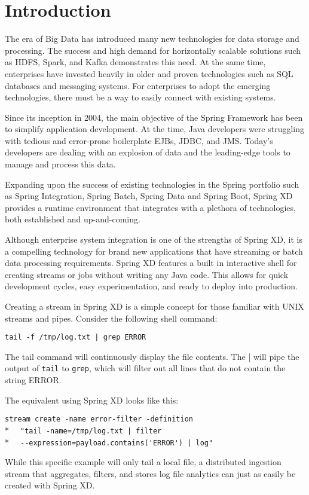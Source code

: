 \section{Introduction}

The era of Big Data has introduced many new technologies for data storage
and processing. The success and high demand for horizontally scalable
solutions such as HDFS\cite{hdfs}, Spark\cite{spark}, and Kafka\cite{kafka} demonstrates
this need.  At the same time, enterprises have invested heavily in older and proven
technologies such as SQL databases and messaging systems. For enterprises
to adopt the emerging technologies, there must be a way to easily
connect with existing systems.

Since its inception in 2004, the main objective of the 
Spring Framework\cite{spring-framework-reference}
has been to simplify application development. At the time, Java developers
were struggling with tedious and error-prone boilerplate EJBs\cite{ejb}, JDBC\cite{jdbc},
and JMS\cite{jms}. Today's developers are dealing with an explosion of data and the
leading-edge tools to manage and process this data.

Expanding upon the success of existing technologies in the Spring portfolio
such as Spring Integration\cite{spring-integration-reference},
Spring Batch\cite{spring-batch-reference}, Spring Data\cite{spring-data-reference} and
Spring Boot\cite{spring-boot-reference},
Spring XD provides a runtime environment that integrates with
a plethora of technologies, both established and up-and-coming.

Although enterprise system integration is one of the strengths of Spring XD,
it is a compelling technology for brand new applications that have streaming
or batch data processing requirements. Spring XD features a built in
interactive shell for creating streams or jobs without writing any Java code.
This allows for quick development cycles, easy experimentation, and ready
to deploy into production.

Creating a stream in Spring XD is a simple concept for those familiar with
UNIX streams and pipes. Consider the following shell command:

\verb;tail -f /tmp/log.txt | grep ERROR;

The tail command will continuously display the file contents. The |
will pipe the output of \texttt{tail} to \texttt{grep}, which will filter 
out all lines that do not contain the string ERROR.

The equivalent using Spring XD looks like this:

\verb;stream create -name error-filter -definition;\\*
\verb;  "tail -name=/tmp/log.txt | filter;\\*
\verb;  --expression=payload.contains('ERROR') | log";

While this specific example will only tail a local file, a distributed 
ingestion stream that aggregates, filters, and stores log file analytics
can just as easily be created with Spring XD.
